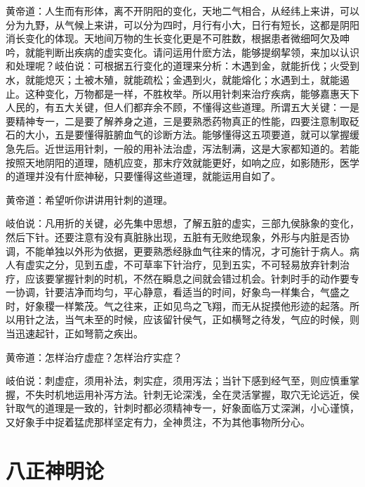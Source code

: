 \documentclass[a4paper,12pt,UTF8,twoside]{ctexbook}
\begin{document}
黄帝道：人生而有形体，离不开阴阳的变化，天地二气相合，从经纬上来讲，可以分为九野，从气候上来讲，可以分为四时，月行有小大，日行有短长，这都是阴阳消长变化的体现。天地间万物的生长变化更是不可胜数，根据患者微细呵欠及呻吟，就能判断出疾病的虚实变化。请问运用什麽方法，能够提纲挈领，来加以认识和处理呢？岐伯说：可根据五行变化的道理来分析：木遇到金，就能折伐；火受到水，就能熄灭；土被木殖，就能疏松；金遇到火，就能熔化；水遇到土，就能遏止。这种变化，万物都是一样，不胜枚举。所以用针刺来治疗疾病，能够嘉惠天下人民的，有五大关键，但人们都弃余不顾，不懂得这些道理。所谓五大关键：一是要精神专一，二是要了解养身之道，三是要熟悉药物真正的性能，四要注意制取砭石的大小，五是要懂得脏腑血气的诊断方法。能够懂得这五项要道，就可以掌握缓急先后。近世运用针刺，一般的用补法治虚，泻法制满，这是大家都知道的。若能按照天地阴阳的道理，随机应变，那末疗效就能更好，如响之应，如影随形，医学的道理并没有什麽神秘，只要懂得这些道理，就能运用自如了。

黄帝道：希望听你讲讲用针刺的道理。

岐伯说：凡用折的关键，必先集中思想，了解五脏的虚实，三部九侯脉象的变化，然后下针。还要注意有没有真脏脉出现，五脏有无败绝现象，外形与内脏是否协调，不能单独以外形为依据，更要熟悉经脉血气往来的情况，才可施针于病人。病人有虚实之分，见到五虚，不可草率下针治疗，见到五实，不可轻易放弃针刺治疗，应该要掌握针刺的时机，不然在瞬息之间就会错过机会。针刺时手的动作要专一协调，针要洁净而均匀，平心静意，看适当的时间，好象鸟一样集合，气盛之时，好象稷一样繁茂。气之往来，正如见鸟之飞翔，而无从捉摸他形迹的起落。所以用针之法，当气未至的时候，应该留针侯气，正如横弩之待发，气应的时候，则当迅速起针，正如弩箭之疾出。

黄帝道：怎样治疗虚症？怎样治疗实症？

岐伯说：刺虚症，须用补法，刺实症，须用泻法；当针下感到经气至，则应慎重掌握，不失时机地运用补泻方法。针刺无论深浅，全在灵活掌握，取穴无论远近，侯针取气的道理是一致的，针刺时都必须精神专一，好象面临万丈深渊，小心谨慎，又好象手中捉着猛虎那样坚定有力，全神贯注，不为其他事物所分心。

\chapter{八正神明论}
\end{document}
